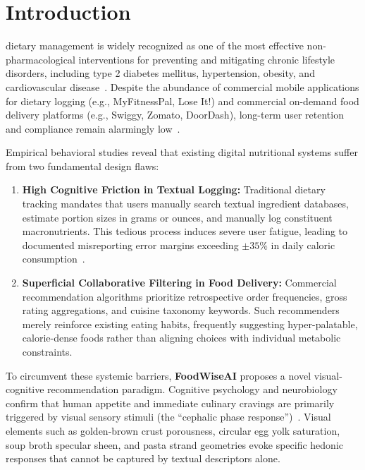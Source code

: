 \documentclass[10pt,journal,compsoc]{IEEEtran}
\begin{document}
\section{Introduction}
 dietary management is widely recognized as one of the most effective non-pharmacological interventions for preventing and mitigating chronic lifestyle disorders, including type 2 diabetes mellitus, hypertension, obesity, and cardiovascular disease~\cite{worldhealth2020}. Despite the abundance of commercial mobile applications for dietary logging (e.g., MyFitnessPal, Lose It!) and commercial on-demand food delivery platforms (e.g., Swiggy, Zomato, DoorDash), long-term user retention and compliance remain alarmingly low~\cite{turner2021}. 

Empirical behavioral studies reveal that existing digital nutritional systems suffer from two fundamental design flaws:
\begin{enumerate}
    \item \textbf{High Cognitive Friction in Textual Logging:} Traditional dietary tracking mandates that users manually search textual ingredient databases, estimate portion sizes in grams or ounces, and manually log constituent macronutrients. This tedious process induces severe user fatigue, leading to documented misreporting error margins exceeding $\pm 35\%$ in daily caloric consumption~\cite{livingstone2004}.
    \item \textbf{Superficial Collaborative Filtering in Food Delivery:} Commercial recommendation algorithms prioritize retrospective order frequencies, gross rating aggregations, and cuisine taxonomy keywords. Such recommenders merely reinforce existing eating habits, frequently suggesting hyper-palatable, calorie-dense foods rather than aligning choices with individual metabolic constraints.
\end{enumerate}

To circumvent these systemic barriers, \textbf{FoodWiseAI} proposes a novel visual-cognitive recommendation paradigm. Cognitive psychology and neurobiology confirm that human appetite and immediate culinary cravings are primarily triggered by visual sensory stimuli (the ``cephalic phase response'')~\cite{spence2016}. Visual elements such as golden-brown crust porousness, circular egg yolk saturation, soup broth specular sheen, and pasta strand geometries evoke specific hedonic responses that cannot be captured by textual descriptors alone.
\end{document}
